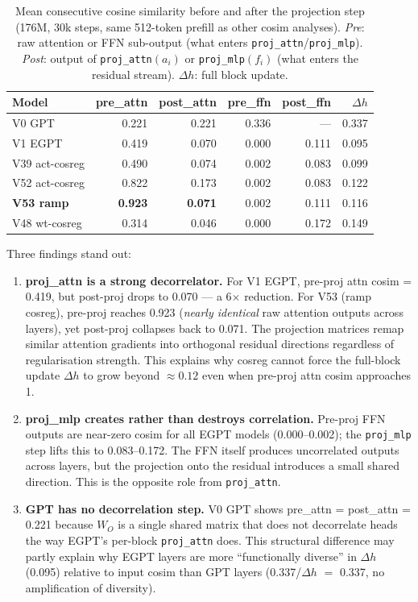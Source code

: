 \begin{table}[ht]
\centering
\caption{%
  Mean consecutive cosine similarity before and after the projection step
  (176M, 30k steps, same 512-token prefill as other cosim analyses).
  \emph{Pre}: raw attention or FFN sub-output (what enters \texttt{proj\_attn}/\texttt{proj\_mlp}).
  \emph{Post}: output of \texttt{proj\_attn}$(a_i)$ or \texttt{proj\_mlp}$(f_i)$
  (what enters the residual stream).
  $\Delta h$: full block update.
}
\label{tab:postproj_cosim_176m}
\small
\begin{tabular}{lrrrrr}
\toprule
\textbf{Model} & pre\_attn & post\_attn & pre\_ffn & post\_ffn & $\Delta h$ \\
\midrule
V0  GPT        & 0.221 & 0.221 & 0.336 & ---   & 0.337 \\
V1  EGPT       & 0.419 & 0.070 & 0.000 & 0.111 & 0.095 \\
V39 act-cosreg & 0.490 & 0.074 & 0.002 & 0.083 & 0.099 \\
V52 act-cosreg & 0.822 & 0.173 & 0.002 & 0.083 & 0.122 \\
\textbf{V53 ramp} & \textbf{0.923} & \textbf{0.071} & 0.002 & 0.111 & 0.116 \\
V48 wt-cosreg  & 0.314 & 0.046 & 0.000 & 0.172 & 0.149 \\
\bottomrule
\end{tabular}
\end{table}

Three findings stand out:

\begin{enumerate}
\item \textbf{proj\_attn is a strong decorrelator.}
For V1 EGPT, pre-proj attn cosim = 0.419, but post-proj drops to 0.070 ---
a 6$\times$ reduction.  For V53 (ramp cosreg), pre-proj reaches 0.923
(\emph{nearly identical} raw attention outputs across layers), yet post-proj
collapses back to 0.071.  The projection matrices remap similar attention
gradients into orthogonal residual directions regardless of regularisation
strength.  This explains why cosreg cannot force the full-block update
$\Delta h$ to grow beyond ${\approx}0.12$ even when pre-proj attn cosim
approaches 1.

\item \textbf{proj\_mlp creates rather than destroys correlation.}
Pre-proj FFN outputs are near-zero cosim for all EGPT models (0.000--0.002);
the \texttt{proj\_mlp} step lifts this to 0.083--0.172.  The FFN itself
produces uncorrelated outputs across layers, but the projection onto the
residual introduces a small shared direction.  This is the opposite role from
\texttt{proj\_attn}.

\item \textbf{GPT has no decorrelation step.}
V0 GPT shows pre\_attn = post\_attn = 0.221 because $W_O$ is a single shared
matrix that does not decorrelate heads the way EGPT's per-block \texttt{proj\_attn}
does.  This structural difference may partly explain why EGPT layers are more
``functionally diverse'' in $\Delta h$ (0.095) relative to input cosim than
GPT layers (0.337/$\Delta h$ $=$ 0.337, no amplification of diversity).
\end{enumerate}

